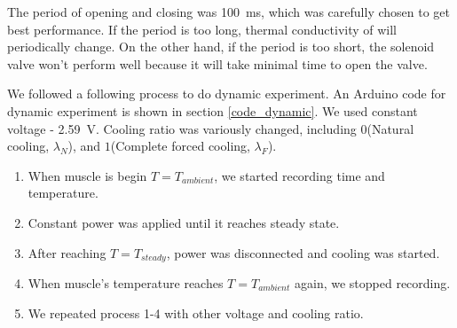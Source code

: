 %

The period of opening and closing was \SI{100}{\milli\second}, which was carefully chosen to get best performance. If the period is too long, thermal conductivity of \scp will periodically change. On the other hand, if the period is too short, the solenoid valve won't perform well because it will take minimal time to open the valve. 

We followed a following process to do dynamic experiment. An Arduino code for dynamic experiment is shown in section \ref{code_dynamic}. We used constant voltage - \SI{2.59}{\volt}. Cooling ratio was variously changed, including $0$(Natural cooling, $\lambda_{N}$), and $1$(Complete forced cooling, $\lambda_{F}$). 
\begin{enumerate}
\item When muscle is begin $T=T_{ambient}$, we started recording time and temperature.
\item Constant power was applied until it reaches steady state.
\item After reaching $T=T_{steady}$, power was disconnected and cooling was started. 
\item When muscle's temperature reaches $T=T_{ambient}$ again, we stopped recording. 
\item We repeated process 1-4 with other voltage and cooling ratio.
\end{enumerate}


